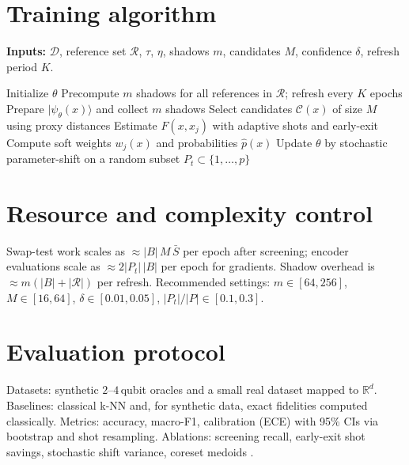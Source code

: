 \documentclass[11pt]{article}
\begin{document}
\section{Training algorithm}
\textbf{Inputs:} $\mathcal{D}$, reference set $\mathcal{R}$, $\tau$, $\eta$, shadows $m$, candidates $M$, confidence $\delta$, refresh period $K$.

\begin{algorithm}[H]
\caption{Enhanced training with screening and stochastic parameter-shift}
\begin{algorithmic}[1]
\State Initialize $\theta$
\State Precompute $m$ shadows for all references in $\mathcal{R}$; refresh every $K$ epochs
      \State Prepare $|\psi_\theta(x)\rangle$ and collect $m$ shadows
      \State Select candidates $\mathcal{C}(x)$ of size $M$ using proxy distances
        \State Estimate $F(x,x_j)$ with adaptive shots and early-exit
      \EndFor
      \State Compute soft weights $w_j(x)$ and probabilities $\hat p(x)$
    \EndFor
    \State Update $\theta$ by stochastic parameter-shift on a random subset $P_t\subset\{1,\dots,p\}$
  \EndFor
\EndFor
\end{algorithmic}
\end{algorithm}

\section{Resource and complexity control}
Swap-test work scales as $\approx |B|\,M\,\bar S$ per epoch after screening; encoder evaluations scale as $\approx 2|P_t|\,|B|$ per epoch for gradients. Shadow overhead is $\approx m(|B|+|\mathcal{R}|)$ per refresh. Recommended settings: $m\in[64,256]$, $M\in[16,64]$, $\delta\in[0.01,0.05]$, $|P_t|/|P|\in[0.1,0.3]$.

\section{Evaluation protocol}
Datasets: synthetic $2$--$4$\,qubit oracles and a small real dataset mapped to $\mathbb{R}^d$. Baselines: classical k-NN and, for synthetic data, exact fidelities computed classically. Metrics: accuracy, macro-F1, calibration (ECE) with 95\% CIs via bootstrap and shot resampling. Ablations: screening recall, early-exit shot savings, stochastic shift variance, coreset medoids \citep{KaufmanRousseeuw1990}.
\end{document}
